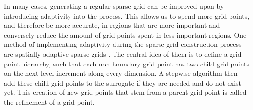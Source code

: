 \documentclass[
  a4paper,  %
  twoside,  %
  bibliography=totoc,
  headsepline,
  cleardoublepage=empty,
  parskip=half,
  draft=false
]{scrbook}
\begin{document}
In many cases, generating a regular sparse grid can be improved upon by introducing adaptivity into the process.
This allows us to spend more grid points, and therefore be more accurate, in regions that are more important and conversely reduce the amount of grid points spent in less important regions.
One method of implementing adaptivity during the sparse grid construction process are spatially adaptive sparse grids \cite{Pflueger2012}.
The central idea of them is to define a grid point hierarchy, such that each non-boundary grid point has two child grid points on the next level increment along every dimension.
A stepwise algorithm then add these child grid points to the surrogate if they are needed and do not exist yet.
This creation of new grid points that stem from a parent grid point is called the refinement of a grid point.
\end{document}
